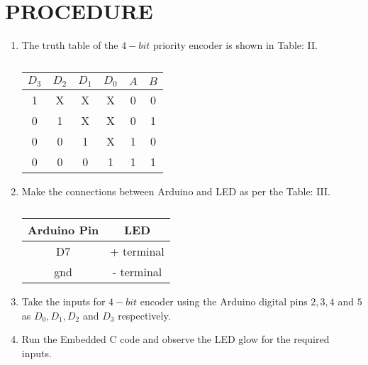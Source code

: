 \documentclass[conference]{IEEEtran}
\begin{document}
\section{PROCEDURE}
\begin {enumerate}
\item The truth table of the $4-bit$ priority encoder is shown in Table: II.
\begin{table}[htbp]                                       
\centering                                                          
\begin{tabular}{| c | c | c | c | c | c |} \hline                                
$D_3$ & $D_2$ & $D_1$ & $D_0$ & $A$ & $B$ \\ \hline 
	1 & X & X & X & 0 & 0 \\ \hline                                   
	0 &  1 & X & X & 0 & 1 \\ \hline                                               
	0 & 0 & 1 & X & 1 & 0 \\ \hline                                           
	0 & 0 & 0 & 1  & 1 & 1  \\ \hline                                        
\end{tabular}                                                       
\vspace{0.1cm}                                                      
\caption{\label{tab:widgets}}                                       
\end{table}

\item Make the connections between Arduino and LED as per the Table: III.
 \begin{table}[htbp]                                       
\centering                                                          
\begin{tabular}{| c | c |} \hline                                
	\textbf{Arduino Pin} & \textbf{LED}  \\\hline 
D7 & + terminal  \\ \hline                                       
gnd  & - terminal \\                                               
\hline                                                              
\end{tabular}                                                       
\vspace{0.1cm}                                                      
\caption{\label{tab:widgets}}                                       
\end{table}

\item Take the inputs for $4-bit$ encoder using the Arduino digital pins $2, 3, 4$ and $5$ as $D_0, D_1, D_2$ and $D_3$ respectively.


\item Run the Embedded C code and observe the LED glow for the required inputs.

	\end {enumerate}
\end{document}
